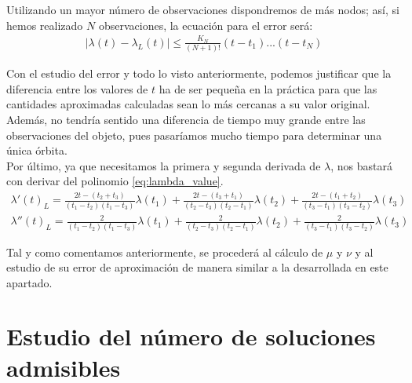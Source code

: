 \documentclass[11pt]{article}
\newcommand\ddfrac[2]{\frac{\displaystyle #1}{\displaystyle #2}}
\begin{document}
Utilizando un mayor número de observaciones dispondremos de más nodos; así, si hemos realizado $N$ observaciones, la ecuación para el error será:
\begin{align}
|\lambda(t)-\lambda_L(t)|\leq\ddfrac{K_N}{(N+1)!}(t-t_1)...(t-t_N)
\label{eq:interpolation_error_n_observations}
\end{align}




Con el estudio del error y todo lo visto anteriormente, podemos justificar que la diferencia entre los valores de $t$ ha de ser pequeña en la práctica para que las cantidades aproximadas calculadas sean lo más cercanas a su valor original. Además, no tendría sentido una diferencia de tiempo muy grande entre las observaciones del objeto, pues pasaríamos mucho tiempo para determinar una única órbita.\\

Por último, ya que necesitamos la primera y segunda derivada de $\lambda$, nos bastará con derivar del polinomio \eqref{eq:lambda_value}.
\begin{align*}
\lambda'(t)_L = \frac{2t-(t_2+t_3)}{(t_1-t_2)(t_1-t_3)}\lambda(t_1)
+\frac{2t-(t_3+t_1)}{(t_2-t_3)(t_2-t_1)}\lambda(t_2)
+\frac{2t-(t_1+t_2)}{(t_3-t_1)(t_3-t_2)}\lambda(t_3)\\
\lambda''(t)_L = \frac{2}{(t_1-t_2)(t_1-t_3)}\lambda(t_1)
+\frac{2}{(t_2-t_3)(t_2-t_1)}\lambda(t_2)
+\frac{2}{(t_3-t_1)(t_3-t_2)}\lambda(t_3)
\end{align*}

Tal y como comentamos anteriormente, se procederá al cálculo de $\mu$ y $\nu$ y al estudio de su error de aproximación de manera similar a la desarrollada en este apartado.

\newpage


\section{Estudio del número de soluciones admisibles}
\end{document}
